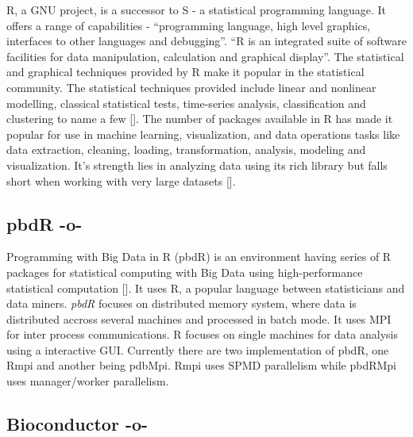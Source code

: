 R, a GNU project, is a successor to S - a statistical programming
language. It offers a range of capabilities - ``programming language,
high level graphics, interfaces to other languages and
debugging''. ``R is an integrated suite of software facilities for
data manipulation, calculation and graphical display''. The
statistical and graphical techniques provided by R make it popular in
the statistical community. The statistical techniques provided include
linear and nonlinear modelling, classical statistical tests,
time-series analysis, classification and clustering to name a
few [\cite{www-R}]. The number of packages available in R has made it
popular for use in machine learning, visualization, and data
operations tasks like data extraction, cleaning, loading,
transformation, analysis, modeling and visualization. It's strength
lies in analyzing data using its rich library but falls short when
working with very large datasets [\cite{book-R}].
    
\subsection{pbdR -o-}

Programming with Big Data in R (pbdR) is an environment having series
of R packages for statistical computing with Big Data using
high-performance statistical computation [\cite{www-pbdR}]. It uses R, a
popular language between statisticians and data miners. \textit{pbdR} focuses
on distributed memory system, where data is distributed accross
several machines and processed in batch mode. It uses MPI for inter
process communications. R focuses on single machines for data analysis
using a interactive GUI. Currently there are two implementation of
pbdR, one Rmpi and another being pdbMpi.  Rmpi uses SPMD parallelism
while pbdRMpi uses manager/worker parallelism.



\subsection{Bioconductor -o-}

